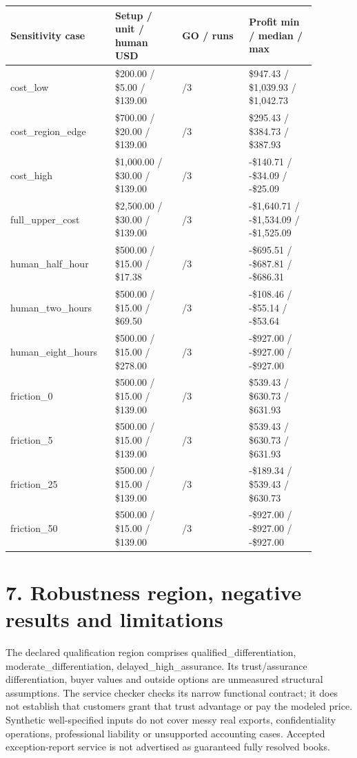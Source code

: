 \documentclass[10pt,letterpaper]{article}
\begin{document}
\begin{longtable}{>{\raggedright\arraybackslash}p{0.280\linewidth}>{\raggedright\arraybackslash}p{0.200\linewidth}>{\raggedright\arraybackslash}p{0.200\linewidth}>{\raggedright\arraybackslash}p{0.200\linewidth}}
\toprule
\textbf{Sensitivity case} & \textbf{Setup / unit / human USD} & \textbf{GO / runs} & \textbf{Profit min / median / max}\\
\midrule
\endhead
cost\_\allowbreak{}low & \$200.00 / \$5.00 / \$139.00 & 3/3 & \$947.43 / \$1,039.93 / \$1,042.73\\
cost\_\allowbreak{}region\_\allowbreak{}edge & \$700.00 / \$20.00 / \$139.00 & 3/3 & \$295.43 / \$384.73 / \$387.93\\
cost\_\allowbreak{}high & \$1,000.00 / \$30.00 / \$139.00 & 0/3 & -\$140.71 / -\$34.09 / -\$25.09\\
full\_\allowbreak{}upper\_\allowbreak{}cost & \$2,500.00 / \$30.00 / \$139.00 & 0/3 & -\$1,640.71 / -\$1,534.09 / -\$1,525.09\\
human\_\allowbreak{}half\_\allowbreak{}hour & \$500.00 / \$15.00 / \$17.38 & 0/3 & -\$695.51 / -\$687.81 / -\$686.31\\
human\_\allowbreak{}two\_\allowbreak{}hours & \$500.00 / \$15.00 / \$69.50 & 0/3 & -\$108.46 / -\$55.14 / -\$53.64\\
human\_\allowbreak{}eight\_\allowbreak{}hours & \$500.00 / \$15.00 / \$278.00 & 0/3 & -\$927.00 / -\$927.00 / -\$927.00\\
friction\_\allowbreak{}0 & \$500.00 / \$15.00 / \$139.00 & 3/3 & \$539.43 / \$630.73 / \$631.93\\
friction\_\allowbreak{}5 & \$500.00 / \$15.00 / \$139.00 & 3/3 & \$539.43 / \$630.73 / \$631.93\\
friction\_\allowbreak{}25 & \$500.00 / \$15.00 / \$139.00 & 2/3 & -\$189.34 / \$539.43 / \$630.73\\
friction\_\allowbreak{}50 & \$500.00 / \$15.00 / \$139.00 & 0/3 & -\$927.00 / -\$927.00 / -\$927.00\\
\bottomrule
\end{longtable}
\section*{7. Robustness region, negative results and limitations}
The declared qualification region comprises qualified\_\allowbreak{}differentiation, moderate\_\allowbreak{}differentiation, delayed\_\allowbreak{}high\_\allowbreak{}assurance. Its trust/assurance differentiation, buyer values and outside options are unmeasured structural assumptions. The service checker checks its narrow functional contract; it does not establish that customers grant that trust advantage or pay the modeled price. Synthetic well-specified inputs do not cover messy real exports, confidentiality operations, professional liability or unsupported accounting cases. Accepted exception-report service is not advertised as guaranteed fully resolved books.
\end{document}
